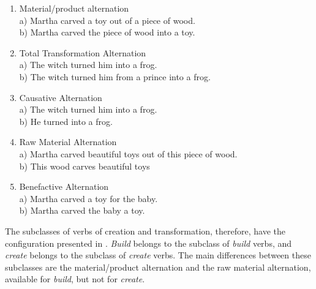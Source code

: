 \documentclass[english]{textolivre}
\begin{document}
\begin{enumerate}[label=(\arabic*),resume]
\item \label{itm26} Material/product alternation \\
a) Martha carved a toy out of a piece of wood.\\
b) Martha carved the piece of wood into a toy.
\item \label{itm27} Total Transformation Alternation \\
a) The witch turned him into a frog. \\
b) The witch turned him from a prince into a frog.
\item \label{itm28} Causative Alternation \\
a) The witch turned him into a frog.\\
b) He turned into a frog.
\item \label{itm29} Raw Material Alternation \\
a) Martha carved beautiful toys out of this piece of wood. \\
b) This wood carves beautiful toys
\item \label{itm30} Benefactive Alternation \\
a) Martha carved a toy for the baby.\\
b) Martha carved the baby a toy. \\
\cite[p.~173,177]{levin_english_1993}
\end{enumerate}

The subclasses of verbs of creation and transformation, therefore, have the configuration presented in . \textit{Build} belongs to the subclass of \textit{build} verbs, and \textit{create} belongs to the subclass of \textit{create} verbs. The main differences between these subclasses are the material/product alternation and the raw material alternation, available for \textit{build}, but not for \textit{create}.
\end{document}

